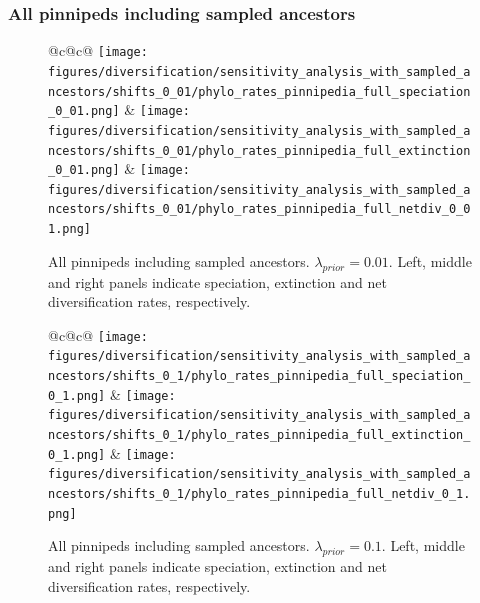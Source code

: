 \documentclass[a4paper, 12pt]{article}
\begin{document}
\subsubsection{All pinnipeds including sampled ancestors}


\begin{figure}[H]
  \centering
  \begin{tabular}{@{}c@{\hspace{.5cm}}c@{}}
  \texttt{[image: figures/diversification/sensitivity\_analysis\_with\_sampled\_ancestors/shifts\_0\_01/phylo\_rates\_pinnipedia\_full\_speciation\_0\_01.png]} &
  \texttt{[image: figures/diversification/sensitivity\_analysis\_with\_sampled\_ancestors/shifts\_0\_01/phylo\_rates\_pinnipedia\_full\_extinction\_0\_01.png]} &
  \texttt{[image: figures/diversification/sensitivity\_analysis\_with\_sampled\_ancestors/shifts\_0\_01/phylo\_rates\_pinnipedia\_full\_netdiv\_0\_01.png]} \\
  \end{tabular}
  \caption{All pinnipeds including sampled ancestors. $\lambda_{prior} = 0.01$. Left, middle and right panels indicate speciation, extinction and net diversification rates, respectively.}
  \label{fig-full-0-01}
\end{figure}


\begin{figure}[H]
  \centering
  \begin{tabular}{@{}c@{\hspace{.5cm}}c@{}}
  \texttt{[image: figures/diversification/sensitivity\_analysis\_with\_sampled\_ancestors/shifts\_0\_1/phylo\_rates\_pinnipedia\_full\_speciation\_0\_1.png]} &
  \texttt{[image: figures/diversification/sensitivity\_analysis\_with\_sampled\_ancestors/shifts\_0\_1/phylo\_rates\_pinnipedia\_full\_extinction\_0\_1.png]} &
  \texttt{[image: figures/diversification/sensitivity\_analysis\_with\_sampled\_ancestors/shifts\_0\_1/phylo\_rates\_pinnipedia\_full\_netdiv\_0\_1.png]} \\
  \end{tabular}
  \caption{All pinnipeds including sampled ancestors. $\lambda_{prior} = 0.1$. Left, middle and right panels indicate speciation, extinction and net diversification rates, respectively.}
  \label{fig-full-0-1}
\end{figure}

\end{document}
